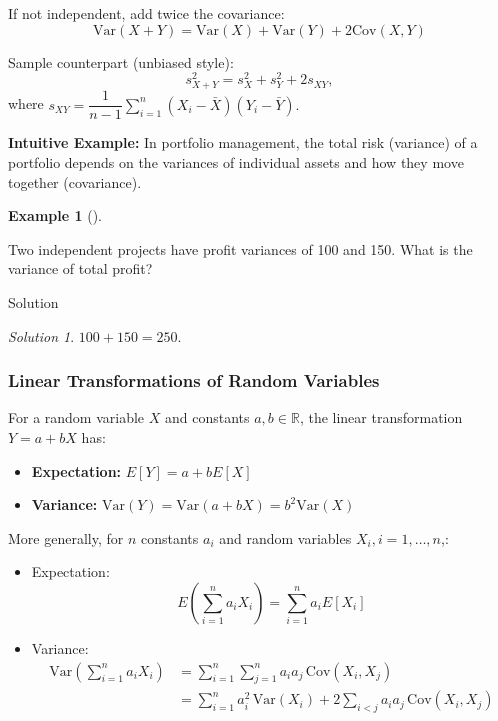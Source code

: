 \documentclass[
  12pt,
  a4paper,
]{scrbook}
\providecommand{\tightlist}{%
  \setlength{\itemsep}{0pt}\setlength{\parskip}{0pt}}
\renewcommand{\tightlist}{\setlength{\itemsep}{0.5\baselineskip}\setlength{\parskip}{0.2\baselineskip}}
\theoremstyle{plain}
\theoremstyle{definition}
\newtheorem{example}{Example}[chapter]
\theoremstyle{remark}
\newtheorem{refsolution}{Solution}[chapter]
\begin{document}
If not independent, add twice the covariance:
\[\text{Var}(X + Y) = \text{Var}(X) + \text{Var}(Y) + 2\text{Cov}(X, Y)\]

Sample counterpart (unbiased style):
\[s_{X+Y}^2 = s_X^2 + s_Y^2 + 2 s_{XY},\] where
\(s_{XY} = \dfrac{1}{n-1}\sum_{i=1}^n (X_i-\bar{X})(Y_i-\bar{Y}).\)

\textbf{Intuitive Example:} In portfolio management, the total risk
(variance) of a portfolio depends on the variances of individual assets
and how they move together (covariance).

\begin{example}[]\protect\hypertarget{exm-6}{}\label{exm-6}

Two independent projects have profit variances of 100 and 150. What is
the variance of total profit?

\end{example}

Solution

\begin{refsolution}
\leavevmode

\(100 + 150 = 250\).

\label{sol-6}

\end{refsolution}

\subsubsection{Linear Transformations of Random
Variables}\label{linear-transformations-of-random-variables}

For a random variable \(X\) and constants \(a, b \in \mathbb{R}\), the
linear transformation \(Y = a + bX\) has:

\begin{itemize}
\tightlist
\item
  \textbf{Expectation:} \(E[Y] = a + bE[X]\)
\item
  \textbf{Variance:}
  \(\text{Var}(Y) = \text{Var}(a + bX) = b^2 \text{Var}(X)\)
\end{itemize}

More generally, for \(n\) constants \(a_i\) and random variables
\(X_i, i=1,\ldots,n\),:

\begin{itemize}
\item
  Expectation: \[
  E\left(\sum_{i=1}^n a_i X_i \right) = \sum_{i=1}^n a_i E[X_i]
  \]
\item
  Variance: \[
  \begin{split}
  \text{Var}\left(\sum_{i=1}^n a_i X_i \right) 
  &= \sum_{i=1}^n \sum_{j=1}^n a_i a_j \, \text{Cov}(X_i, X_j) \\
  &= \sum_{i=1}^n a_i^2 \, \text{Var}(X_i) + 2 \sum_{i<j} a_i a_j \, \text{Cov}(X_i, X_j)
  \end{split}
  \]
\end{itemize}
\end{document}
